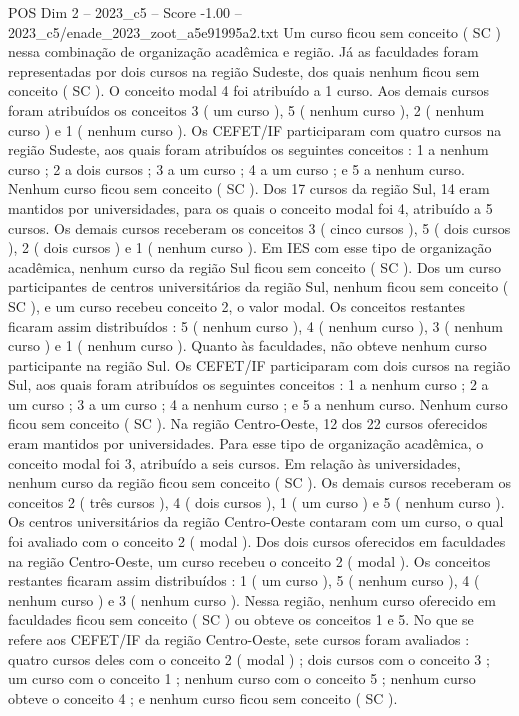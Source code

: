 \begin{textsample}{POS Dim 2 – 2023\_c5 – Score -1.00 – 2023\_c5/enade\_2023\_zoot\_a5e91995a2.txt}
Um curso ficou sem conceito ( SC ) nessa combinação de organização acadêmica e região.
Já as faculdades foram representadas por dois cursos na região Sudeste, dos quais nenhum ficou sem conceito ( SC ).
O conceito modal 4 foi atribuído a 1 curso.
Aos demais cursos foram atribuídos os conceitos 3 ( um curso ), 5 ( nenhum curso ), 2 ( nenhum curso ) e 1 ( nenhum curso ).
Os CEFET/IF participaram com quatro cursos na região Sudeste, aos quais foram atribuídos os seguintes conceitos : 1 a nenhum curso ; 2 a dois cursos ; 3 a um curso ; 4 a um curso ; e 5 a nenhum curso.
Nenhum curso ficou sem conceito ( SC ).
Dos 17 cursos da região Sul, 14 eram mantidos por universidades, para os quais o conceito modal foi 4, atribuído a 5 cursos.
Os demais cursos receberam os conceitos 3 ( cinco cursos ), 5 ( dois cursos ), 2 ( dois cursos ) e 1 ( nenhum curso ).
Em IES com esse tipo de organização acadêmica, nenhum curso da região Sul ficou sem conceito ( SC ).
Dos um curso participantes de centros universitários da região Sul, nenhum ficou sem conceito ( SC ), e um curso recebeu conceito 2, o valor modal.
Os conceitos restantes ficaram assim distribuídos : 5 ( nenhum curso ), 4 ( nenhum curso ), 3 ( nenhum curso ) e 1 ( nenhum curso ).
Quanto às faculdades, não obteve nenhum curso participante na região Sul.
Os CEFET/IF participaram com dois cursos na região Sul, aos quais foram atribuídos os seguintes conceitos : 1 a nenhum curso ; 2 a um curso ; 3 a um curso ; 4 a nenhum curso ; e 5 a nenhum curso.
Nenhum curso ficou sem conceito ( SC ).
Na região Centro-Oeste, 12 dos 22 cursos oferecidos eram mantidos por universidades.
Para esse tipo de organização acadêmica, o conceito modal foi 3, atribuído a seis cursos.
Em relação às universidades, nenhum curso da região ficou sem conceito ( SC ).
Os demais cursos receberam os conceitos 2 ( três cursos ), 4 ( dois cursos ), 1 ( um curso ) e 5 ( nenhum curso ).
Os centros universitários da região Centro-Oeste contaram com um curso, o qual foi avaliado com o conceito 2 ( modal ).
Dos dois cursos oferecidos em faculdades na região Centro-Oeste, um curso recebeu o conceito 2 ( modal ).
Os conceitos restantes ficaram assim distribuídos : 1 ( um curso ), 5 ( nenhum curso ), 4 ( nenhum curso ) e 3 ( nenhum curso ).
Nessa região, nenhum curso oferecido em faculdades ficou sem conceito ( SC ) ou obteve os conceitos 1 e 5.
No que se refere aos CEFET/IF da região Centro-Oeste, sete cursos foram avaliados : quatro cursos deles com o conceito 2 ( modal ) ; dois cursos com o conceito 3 ; um curso com o conceito 1 ; nenhum curso com o conceito 5 ; nenhum curso obteve o conceito 4 ; e nenhum curso ficou sem conceito ( SC ).

\end{textsample}
